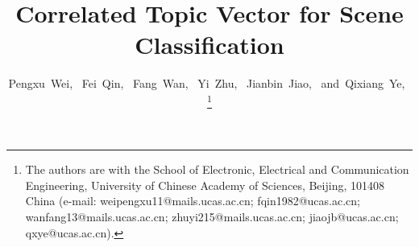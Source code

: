 \documentclass[journal]{IEEEtran}
\begin{document}
%
\title{Correlated Topic Vector for Scene Classification}
%
%
%

\author{Pengxu~Wei,~\IEEEmembership{}
        Fei~Qin,~\IEEEmembership{}
        Fang~Wan,~\IEEEmembership{}
        Yi~Zhu,~\IEEEmembership{}
        Jianbin~Jiao,~
        and~Qixiang~Ye,~
\thanks{The authors are with the School of Electronic, Electrical and Communication Engineering, University of Chinese Academy of Sciences, Beijing,
101408 China (e-mail: weipengxu11@mails.ucas.ac.cn; fqin1982@ucas.ac.cn; wanfang13@mails.ucas.ac.cn; zhuyi215@mails.ucas.ac.cn; jiaojb@ucas.ac.cn; qxye@ucas.ac.cn).}%
}

%
%
\end{document}
